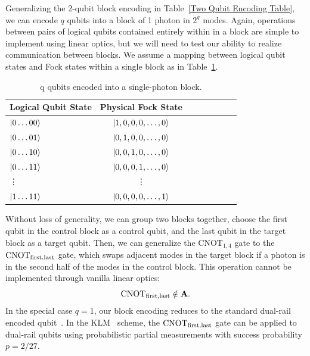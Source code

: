 \documentclass[aps,pra,twocolumn,superscriptaddress,floatfix,10pt]{revtex4}
\begin{document}
Generalizing the 2-qubit block encoding in Table~\ref{Two Qubit Encoding Table}, we can encode $q$ qubits into a block of 1 photon in $2^q$ modes. Again, operations between pairs of logical qubits contained entirely within in a block are simple to implement using linear optics, but we will need to test our ability to realize communication between blocks. We assume a  mapping between logical qubit states and Fock states within a single block as in Table~\ref{q Qubit Block Encoding}.
\begin {table}[h]
\begin{center}
	\begin{tabular}{l*{6}{c}r} 
		Logical Qubit State      \quad \quad \quad     & Physical Fock State \\
		\hline 
		\quad \quad \quad $\ket{0\dots00}$     & $\ket{1,0,0,0,\dots,0}$ \\
		\quad \quad \quad $\ket{0\dots01}$            & $\ket{0,1,0,0,\dots,0}$ \\
		\quad \quad \quad $\ket{0\dots10}$            & $\ket{0,0,1,0,\dots,0}$ \\
		\quad \quad \quad $\ket{0\dots11}$            & $\ket{0,0,0,1,\dots,0}$ \\
		\quad \quad \quad \quad \enspace \vdots & \vdots \\
		\quad \quad \quad $\ket{1\dots11}$            & $\ket{0,0,0,0,\dots,1}$ \\
	\end{tabular}
	\caption{ \label{q Qubit Block Encoding} q qubits encoded into a single-photon block.}
\end{center}
\end{table}
Without loss of generality, we can group two blocks together, choose the first qubit in the control block as a control qubit, and the last qubit in the target block as a target qubit. Then, we can generalize the $\mbox{CNOT}_{1,4}$ gate to the $\mbox{CNOT}_{\rm first,last}$ gate, which swaps adjacent modes in the target block if a photon is in the second half of the modes in the control block. This operation cannot be implemented through vanilla linear optics:
\begin{equation}
\mbox{CNOT}_{\rm first,last} \notin \textbf{A}.
\end{equation}
In the special case $q=1$, our block encoding reduces to the standard dual-rail encoded qubit~\cite{Review Paper}. In the KLM~\cite{KLM,KLM2} scheme, the $\mbox{CNOT}_{\rm first,last}$ gate can be applied to dual-rail qubits using probabilistic partial measurements with success probability $p=2/27$. 
\end{document}
